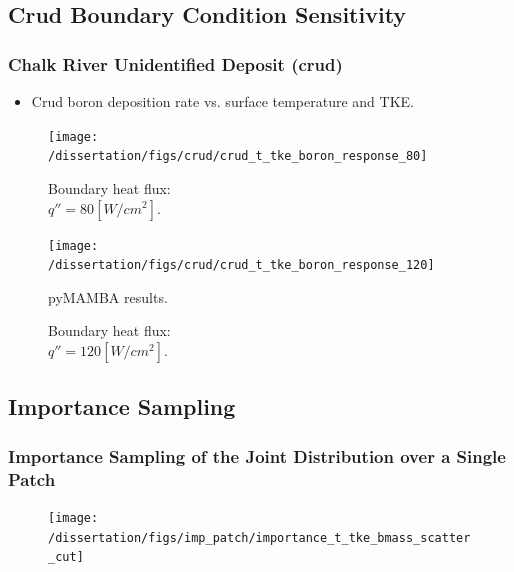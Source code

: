 \documentclass[t, pdftex]{beamer}
\begin{document}
\subsection*{Crud Boundary Condition Sensitivity}
\begin{frame}
\frametitle{Chalk River Unidentified Deposit (crud)}
\vspace{-12pt}
\begin{itemize}
    \item Crud boron deposition rate vs. surface temperature and TKE.
\end{itemize}
\begin{figure}
    \centering
    \begin{minipage}{.5\textwidth}
        \centering
        \texttt{[image: /dissertation/figs/crud/crud\_t\_tke\_boron\_response\_80]}
        \caption{\centering Boundary heat flux: \\ $q''=80[W/cm^2]$.  }
    \end{minipage}%
    \begin{minipage}{.5\textwidth}
        \centering
        \texttt{[image: /dissertation/figs/crud/crud\_t\_tke\_boron\_response\_120]}
        \caption{\centering  Boundary heat flux: \\ $q''=120[W/cm^2]$. }
    \end{minipage}
    pyMAMBA results. 
\end{figure}
\end{frame}

\subsection*{Importance Sampling}
\begin{frame}
\frametitle{\small Importance Sampling of the Joint Distribution over a Single Patch}
\vspace{-19pt}
\begin{figure}[!htbp]
    \centering
    \texttt{[image: /dissertation/figs/imp\_patch/importance\_t\_tke\_bmass\_scatter\_cut]}
    \label{model_overview}
\end{figure}
\end{frame}
\end{document}
